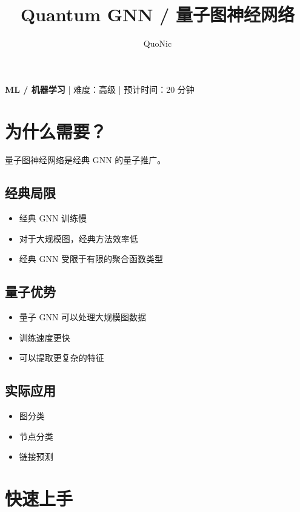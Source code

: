 \documentclass[12pt,a4paper]{article}
\title{Quantum GNN / 量子图神经网络}
\author{QuoNic}
\date{}
\begin{document}
\maketitle

\begin{center}
\textbf{ML / 机器学习} | 难度：高级 | 预计时间：20 分钟
\end{center}

\tableofcontents
\newpage

\section{为什么需要？}

量子图神经网络是经典 GNN 的量子推广。

\subsection{经典局限}
\begin{itemize}
  \item 经典 GNN 训练慢
  \item 对于大规模图，经典方法效率低
  \item 经典 GNN 受限于有限的聚合函数类型
\end{itemize}

\subsection{量子优势}
\begin{itemize}
  \item 量子 GNN 可以处理大规模图数据
  \item 训练速度更快
  \item 可以提取更复杂的特征
\end{itemize}

\subsection{实际应用}
\begin{itemize}
  \item 图分类
  \item 节点分类
  \item 链接预测
\end{itemize}

\section{快速上手}
\end{document}
